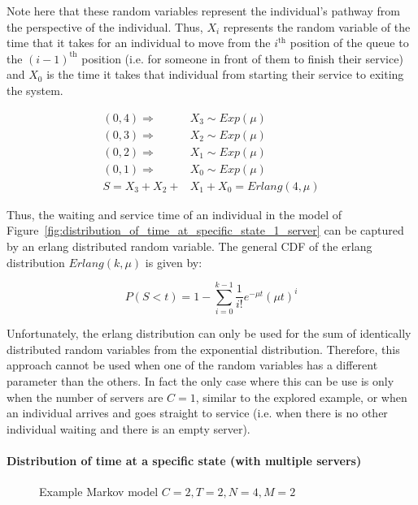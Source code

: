 Note here that these random variables represent the individual's pathway from
the perspective of the individual.
Thus, \(X_i\) represents the random variable of the time that it takes for an
individual to move from the \(i^{\text{th}}\) position of the queue to the
\((i-1)^{\text{th}}\) position (i.e. for someone in front of them to finish
their service) and \(X_0\) is the time it takes that individual from
starting their service to exiting the system.


\begin{align}
    (0,4) \Rightarrow \quad & X_3 \sim Exp(\mu) \nonumber \\
    (0,3) \Rightarrow \quad & X_2 \sim Exp(\mu) \nonumber \\
    (0,2) \Rightarrow \quad & X_1 \sim Exp(\mu) \nonumber \\
    (0,1) \Rightarrow \quad & X_0 \sim Exp(\mu) \nonumber \\
    S = X_3 + X_2 + & X_1 + X_0 = Erlang(4, \mu)
\end{align}

Thus, the waiting and service time of an individual in the model of
Figure~\ref{fig:distribution_of_time_at_specific_state_1_server}
can be captured by an
erlang distributed random variable.
The general CDF of the erlang distribution \(Erlang(k, \mu)\) is given by:

\begin{equation} \label{eq:cdf_erlang}
    P(S < t) = 1 - \sum_{i=0}^{k-1} \frac{1}{i!} e^{-\mu t} (\mu t)^i
\end{equation}

Unfortunately, the erlang distribution can only be used for the sum of
identically distributed random variables from the exponential distribution.
Therefore, this approach cannot be used when one of the random variables has a
different parameter than the others.
In fact the only case where this can be use is only when the number of servers 
are \(C=1\), similar to the explored example, or when an individual arrives
and goes straight to service (i.e. when there is no other individual waiting
and there is an empty server).


\paragraph{Distribution of time at a specific state (with multiple servers)}

\begin{figure}[H]
    \centering
    \scalebox{0.75}{}
    \caption{Example Markov model \(C=2, T=2, N=4, M=2\)}
    \label{fig:distribution_of_time_at_specific_state_2_servers}
\end{figure}

